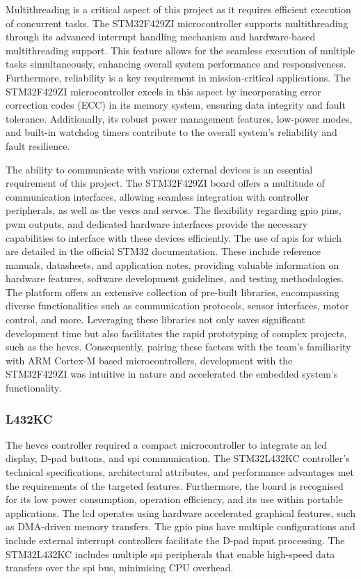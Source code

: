 \documentclass [12pt]{article}
\begin{document}
Multithreading is a critical aspect of this project as it requires efficient execution of concurrent tasks. The STM32F429ZI microcontroller supports multithreading through its advanced interrupt handling mechanism and hardware-based multithreading support. This feature allows for the seamless execution of multiple tasks simultaneously, enhancing overall system performance and responsiveness. Furthermore, reliability is a key requirement in mission-critical applications. The STM32F429ZI microcontroller excels in this aspect by incorporating error correction codes (ECC) in its memory system, ensuring data integrity and fault tolerance. Additionally, its robust power management features, low-power modes, and built-in watchdog timers contribute to the overall system's reliability and fault resilience.

The ability to communicate with various external devices is an essential requirement of this project. The STM32F429ZI board offers a multitude of communication interfaces, allowing seamless integration with controller peripherals, as well as the \gls{vesc}s and servos. The flexibility regarding \gls{gpio} pins, \gls{pwm} outputs, and dedicated hardware interfaces provide the necessary capabilities to interface with these devices efficiently. The use of \gls{api}s for which are detailed in the official STM32 documentation. These include reference manuals, datasheets, and application notes, providing valuable information on hardware features, software development guidelines, and testing methodologies. The platform offers an extensive collection of pre-built libraries, encompassing diverse functionalities such as communication protocols, sensor interfaces, motor control, and more. Leveraging these libraries not only saves significant development time but also facilitates the rapid prototyping of complex projects, such as the \gls{hevcs}. Consequently, pairing these factors with the team’s familiarity with ARM Cortex-M based microcontrollers, development with the STM32F429ZI was intuitive in nature and accelerated the embedded system’s functionality.

\subsubsection{L432KC}
The \gls{hevcs} controller required a compact microcontroller to integrate an \gls{lcd} display, D-pad buttons, and \gls{spi} communication. The STM32L432KC controller’s technical specifications, architectural attributes, and performance advantages met the requirements of the targeted features. Furthermore, the board is recognised for its low power consumption, operation efficiency, and its use within portable applications. The \gls{lcd} operates using hardware accelerated graphical features, such as DMA-driven memory transfers. The \gls{gpio} pins have multiple configurations and include external interrupt controllers facilitate the D-pad input processing. The STM32L432KC includes multiple \gls{spi} peripherals that enable high-speed data transfers over the \gls{spi} bus, minimising CPU overhead.
\end{document}

